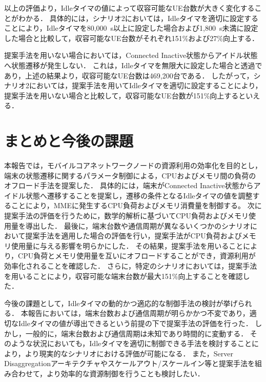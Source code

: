 \documentclass[technicalreport]{ieicej-rev}
\begin{document}
以上の評価より，Idleタイマの値によって収容可能なUE台数が大きく変化することがわかる．
具体的には，シナリオ2においては，Idleタイマを適切に設定することにより，Idleタイマを80,000~s以上に設定した場合および1,800~s未満に設定した場合と比較して，収容可能なUE台数がそれぞれ151\%および27\%向上する．

提案手法を用いない場合においては，Connected Inactive状態からアイドル状態へ状態遷移が発生しない．
これは，Idleタイマを無限大に設定した場合と透過であり，上述の結果より，収容可能なUE台数は469,200台である．
したがって，シナリオ2においては，提案手法を用いてIdleタイマを適切に設定することにより，提案手法を用いない場合と比較して，収容可能なUE台数が151\%向上するといえる．

\section{まとめと今後の課題}
\label{sec:まとめと今後の課題}
本報告では，モバイルコアネットワークノードの資源利用の効率化を目的とし，端末の状態遷移に関するパラメータ制御による，CPUおよびメモリ間の負荷のオフロード手法を提案した．
具体的には，端末がConnected Inactive状態からアイドル状態へ遷移することを提案し，遷移の条件となるIdleタイマの値を調整することにより，MMEに発生するCPU負荷およびメモリ消費量を制御する。
次に提案手法の評価を行うために，数学的解析に基づいてCPU負荷およびメモリ使用量を導出した．
最後に，端末台数や通信周期が異なるいくつかのシナリオにおいて提案手法を適用した場合の評価を行い，提案手法がCPU負荷およびメモリ使用量に与える影響を明らかにした．
その結果，提案手法を用いることにより，CPU負荷とメモリ使用量を互いにオフロードすることができ，資源利用が効率化されることを確認した．
さらに，特定のシナリオにおいては，提案手法を用いることにより，収容可能な端末台数が最大151\%向上することを確認した．

今後の課題として，Idleタイマの動的かつ適応的な制御手法の検討が挙げられる．
本報告においては，端末台数および通信周期が明らかかつ不変であり，適切なIdleタイマの値が導出できるという前提の下で提案手法の評価を行った．
しかし，一般的に，端末台数および通信周期は未知であり時間的に変動する．
そのような状況においても，Idleタイマを適切に制御できる手法を検討することにより，より現実的なシナリオにおける評価が可能になる．
また，Server Disaggregationアーキテクチャやスケールアウト/スケールイン等と提案手法を組み合わせて，より効率的な資源制御を行うことも検討したい．



\end{document}

